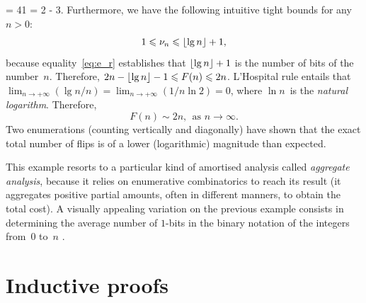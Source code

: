 = 41 = 2  - 3\). Furthermore, we have the following intuitive
tight bounds for any \(n>0\):
\begin{equation*}
1 \leqslant \nu_{n} \leqslant \lfloor{\lg n}\rfloor + 1,
\end{equation*}
because equality~\eqref{eq:e_r} establishes that \(\lfloor{\lg n}\rfloor + 1\)
is the number of bits of the number~\(n\). Therefore, \(2n -
\lfloor{\lg n}\rfloor - 1 \leqslant F(n) \leqslant 2n\). L'Hospital rule
entails that \(\lim_{n \to +\infty}{(\lg n/n)} = \lim_{n \to
  +\infty}(1/n\ln 2) = 0\), where \(\ln n\)~is the \emph{natural
logarithm}. Therefore,
\begin{equation*}
F(n) \sim 2n,\;\, \text{as \(n \rightarrow \infty\)}.
\end{equation*}
Two enumerations (counting vertically and diagonally) have shown that
the exact total number of flips is of a lower (logarithmic) magnitude
than expected.

This example resorts to a particular kind of amortised analysis called
\emph{aggregate analysis}, because it relies on enumerative
combinatorics \citep{Stanley_1999a,Stanley_1999b,Martin_2001} to reach
its result (it aggregates positive partial amounts, often in different
manners, to obtain the total cost). A visually appealing variation on
the previous example consists in determining the average number of
\(1\)-bits in the binary notation of the integers from~\(0\) to~\(n\)
\citep{Bush_1940}.

\section{Inductive proofs}

